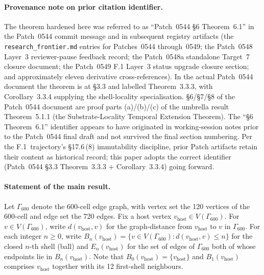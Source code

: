 \documentclass[11pt,letterpaper]{article}
\newcommand{\vhost}{v_{\text{host}}}
\newcommand{\Gsixcell}{\Gamma_{600}}
\begin{document}
\paragraph{Provenance note on prior citation identifier.}
The theorem hardened here was referred to as ``Patch~0544 \S6 Theorem~6.1'' in the Patch~0544 commit message and in subsequent registry artifacts (the {\tt research\_frontier.md} entries for Patches~0544 through~0549; the Patch~0548 Layer~3 reviewer-pause feedback record; the Patch~0548a standalone Target~7 closure document; the Patch~0549 F.1 Layer~3 status upgrade closure section; and approximately eleven derivative cross-references). In the actual Patch~0544 document the theorem is at \S3.3 and labelled Theorem~3.3.3, with Corollary~3.3.4 supplying the shell-locality specialisation. \S6/\S7/\S8 of the Patch~0544 document are proof parts (a)/(b)/(c) of the umbrella result Theorem~5.1.1 (the Substrate-Locality Temporal Extension Theorem). The ``\S6 Theorem~6.1'' identifier appears to have originated in working-session notes prior to the Patch~0544 final draft and not survived the final section numbering. Per the F.1~trajectory's \S17.6\,(8) immutability discipline, prior Patch artifacts retain their content as historical record; this paper adopts the correct identifier (Patch~0544 \S3.3 Theorem~3.3.3 + Corollary~3.3.4) going forward.

\paragraph{Statement of the main result.}
Let $\Gsixcell$ denote the 600-cell edge graph, with vertex set the 120 vertices of the 600-cell and edge set the 720 edges. Fix a host vertex $\vhost \in V(\Gsixcell)$. For $v \in V(\Gsixcell)$, write $d(\vhost, v)$ for the graph-distance from $\vhost$ to $v$ in $\Gsixcell$. For each integer $n \geq 0$, write $B_n(\vhost) = \{v \in V(\Gsixcell) : d(\vhost, v) \leq n\}$ for the closed $n$-th shell (ball) and $E_n(\vhost)$ for the set of edges of $\Gsixcell$ both of whose endpoints lie in $B_n(\vhost)$. Note that $B_0(\vhost) = \{\vhost\}$ and $B_1(\vhost)$ comprises $\vhost$ together with its 12 first-shell neighbours.
\end{document}
